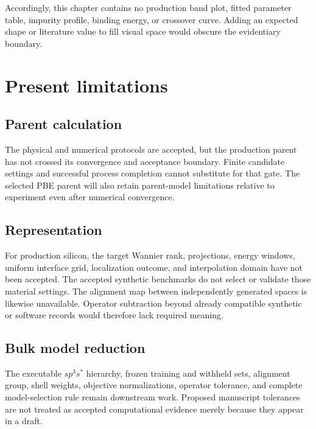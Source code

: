 Accordingly, this chapter contains no production band plot, fitted parameter
table, impurity profile, binding energy, or crossover curve. Adding an expected
shape or literature value to fill visual space would obscure the evidentiary
boundary.

\section{Present limitations}


\subsection{Parent calculation}

The physical and numerical protocols are accepted, but the production parent
has not crossed its convergence and acceptance boundary. Finite candidate
settings and successful process completion cannot substitute for that gate.
The selected PBE parent will also retain parent-model limitations relative to
experiment even after numerical convergence.


\subsection{Representation}

For production silicon, the target Wannier rank, projections, energy windows,
uniform interface grid, localization outcome, and interpolation domain have not
been accepted. The accepted synthetic benchmarks do not select or validate
those material settings. The alignment map between independently generated
spaces is likewise unavailable. Operator subtraction beyond already compatible
synthetic or software records would therefore lack required meaning.

\subsection{Bulk model reduction}

The executable $sp^3s^{\ast}$ hierarchy, frozen training and withheld sets,
alignment group, shell weights, objective normalizations, operator tolerance,
and complete model-selection rule remain downstream work. Proposed manuscript
tolerances are not treated as accepted computational evidence merely because
they appear in a draft.

